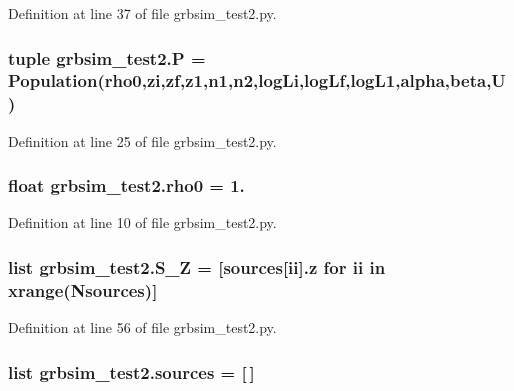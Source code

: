 Definition at line 37 of file grbsim\-\_\-test2.\-py.

\hypertarget{namespacegrbsim__test2_ac5a4085bab1950b51a1ca1f9350faff3}{
\subsubsection[{P}]{\setlength{\rightskip}{0pt plus 5cm}tuple grbsim\-\_\-test2.\-P = {\bf Population}({\bf rho0},{\bf zi},{\bf zf},{\bf z1},{\bf n1},{\bf n2},{\bf log\-Li},{\bf log\-Lf},{\bf log\-L1},{\bf alpha},{\bf beta},{\bf U})}}\label{namespacegrbsim__test2_ac5a4085bab1950b51a1ca1f9350faff3}


Definition at line 25 of file grbsim\-\_\-test2.\-py.

\hypertarget{namespacegrbsim__test2_a05cb2b0d5b3df83de2b21ecf357c1f7a}{
\subsubsection[{rho0}]{\setlength{\rightskip}{0pt plus 5cm}float grbsim\-\_\-test2.\-rho0 = 1.}}\label{namespacegrbsim__test2_a05cb2b0d5b3df83de2b21ecf357c1f7a}


Definition at line 10 of file grbsim\-\_\-test2.\-py.

\hypertarget{namespacegrbsim__test2_a6f7437465e3772d7528472e0f2f47441}{
\subsubsection[{S\-\_\-\-Z}]{\setlength{\rightskip}{0pt plus 5cm}list grbsim\-\_\-test2.\-S\-\_\-\-Z = \mbox{[}{\bf sources}\mbox{[}ii\mbox{]}.z for ii in xrange({\bf Nsources})\mbox{]}}}\label{namespacegrbsim__test2_a6f7437465e3772d7528472e0f2f47441}


Definition at line 56 of file grbsim\-\_\-test2.\-py.

\hypertarget{namespacegrbsim__test2_a641d37ace029267317c8dee4d92f8073}{
\subsubsection[{sources}]{\setlength{\rightskip}{0pt plus 5cm}list grbsim\-\_\-test2.\-sources = \mbox{[}$\,$\mbox{]}}}\label{namespacegrbsim__test2_a641d37ace029267317c8dee4d92f8073}


